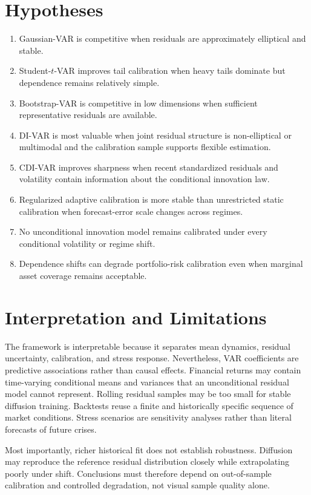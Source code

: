 \documentclass[11pt]{article}
\begin{document}
\section{Hypotheses}

\begin{enumerate}
    \item Gaussian-VAR is competitive when residuals are approximately elliptical and stable.
    \item Student-$t$-VAR improves tail calibration when heavy tails dominate but dependence remains relatively simple.
    \item Bootstrap-VAR is competitive in low dimensions when sufficient representative residuals are available.
    \item DI-VAR is most valuable when joint residual structure is non-elliptical or multimodal and the calibration sample supports flexible estimation.
    \item CDI-VAR improves sharpness when recent standardized residuals and volatility contain information about the conditional innovation law.
    \item Regularized adaptive calibration is more stable than unrestricted static calibration when forecast-error scale changes across regimes.
    \item No unconditional innovation model remains calibrated under every conditional volatility or regime shift.
    \item Dependence shifts can degrade portfolio-risk calibration even when marginal asset coverage remains acceptable.
\end{enumerate}

\section{Interpretation and Limitations}

The framework is interpretable because it separates mean dynamics, residual uncertainty, calibration, and stress response. Nevertheless, VAR coefficients are predictive associations rather than causal effects. Financial returns may contain time-varying conditional means and variances that an unconditional residual model cannot represent. Rolling residual samples may be too small for stable diffusion training. Backtests reuse a finite and historically specific sequence of market conditions. Stress scenarios are sensitivity analyses rather than literal forecasts of future crises.

Most importantly, richer historical fit does not establish robustness. Diffusion may reproduce the reference residual distribution closely while extrapolating poorly under shift. Conclusions must therefore depend on out-of-sample calibration and controlled degradation, not visual sample quality alone.
\end{document}

